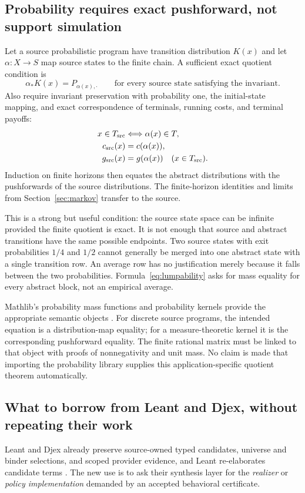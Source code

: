 \subsection{Probability requires exact pushforward, not support simulation}
Let a source probabilistic program have transition distribution $K(x)$ and let
$\alpha:X\to S$ map source states to the finite chain. A sufficient exact
quotient condition is
\begin{equation}
 \alpha_*K(x)=P_{\alpha(x),\cdot}
 \qquad\text{for every source state satisfying the invariant.}
 \label{eq:lumpability}
\end{equation}
Also require invariant preservation with probability one, the initial-state
mapping, and exact correspondence of terminals, running costs, and terminal
payoffs:
\begin{align*}
 x\in T_{\rm src}&\Longleftrightarrow\alpha(x)\in T,\\
 c_{\rm src}(x)&=c(\alpha(x)),\\
 g_{\rm src}(x)&=g(\alpha(x))\quad(x\in T_{\rm src}).
\end{align*}
Induction on finite horizons then equates the abstract distributions with the
pushforwards of the source distributions. The finite-horizon identities and
limits from Section~\ref{sec:markov} transfer to the source.

This is a strong but useful condition: the source state space can be infinite
provided the finite quotient is exact. It is not enough that source and
abstract transitions have the same possible endpoints. Two source states with
exit probabilities $1/4$ and $1/2$ cannot generally be merged into one abstract
state with a single transition row. An average row has no justification merely
because it falls between the two probabilities. Formula~\eqref{eq:lumpability}
asks for mass equality for every abstract block, not an empirical average.

Mathlib's probability mass functions and probability kernels provide the
appropriate semantic objects \cite{mathlib-pmf,mathlib-kernel}. For discrete
source programs, the intended equation is a distribution-map equality; for a
measure-theoretic kernel it is the corresponding pushforward equality. The
finite rational matrix must be linked to that object with proofs of
nonnegativity and unit mass. No claim is made that importing the probability
library supplies this application-specific quotient theorem automatically.

\subsection{What to borrow from Leant and Djex, without repeating their work}
Leant and Djex already preserve source-owned typed candidates, universe and
binder selections, and scoped provider evidence, and Leant re-elaborates
candidate terms \cite{leant,djex}. The new use is to ask their synthesis layer
for the \emph{realizer} or \emph{policy implementation} demanded by an accepted
behavioral certificate.

